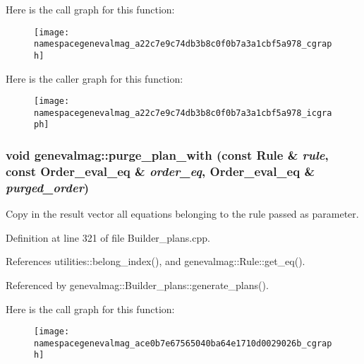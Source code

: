 Here is the call graph for this function:\nopagebreak
\begin{figure}[H]
\begin{center}
\leavevmode
\texttt{[image: namespacegenevalmag\_a22c7e9c74db3b8c0f0b7a3a1cbf5a978\_cgraph]}
\end{center}
\end{figure}




Here is the caller graph for this function:\nopagebreak
\begin{figure}[H]
\begin{center}
\leavevmode
\texttt{[image: namespacegenevalmag\_a22c7e9c74db3b8c0f0b7a3a1cbf5a978\_icgraph]}
\end{center}
\end{figure}


\hypertarget{namespacegenevalmag_ace0b7e67565040ba64e1710d0029026b}{
\subsubsection[{purge\_\-plan\_\-with}]{\setlength{\rightskip}{0pt plus 5cm}void genevalmag::purge\_\-plan\_\-with (const Rule \& {\em rule}, \/  const Order\_\-eval\_\-eq \& {\em order\_\-eq}, \/  Order\_\-eval\_\-eq \& {\em purged\_\-order})}}
\label{namespacegenevalmag_ace0b7e67565040ba64e1710d0029026b}
Copy in the result vector all equations belonging to the rule passed as parameter. 

Definition at line 321 of file Builder\_\-plans.cpp.



References utilities::belong\_\-index(), and genevalmag::Rule::get\_\-eq().



Referenced by genevalmag::Builder\_\-plans::generate\_\-plans().



Here is the call graph for this function:\nopagebreak
\begin{figure}[H]
\begin{center}
\leavevmode
\texttt{[image: namespacegenevalmag\_ace0b7e67565040ba64e1710d0029026b\_cgraph]}
\end{center}
\end{figure}




